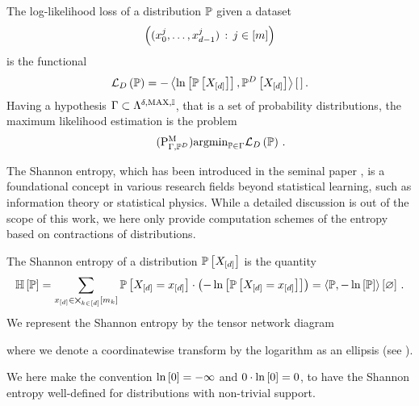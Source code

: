 \begin{definition}
    \label{def:loss}
    The log-likelihood loss of a distribution $\mathbb{P}$ given a dataset
    \begin{align*}
        \left(({x_{0}^{j},\ldots,x_{d-1}^{j}})\,:\,j\in[m]\right)
    \end{align*}
    is the functional
    \begin{align*}
        \mathcal{L}_{D}\left(\mathbb{P}\right)
        = -\left\langle \ln \left[ \mathbb{P}\left[X_{[d]}\right] \right],\mathbb{P}^{D}\left[X_{[d]}\right]\right\rangle \left[ \, \right] .
    \end{align*}
    Having a hypothesis $\Gamma\subset\Lambda^{\delta,\mathrm{MAX},\mathbb{I}}$, that is a set of probability distributions, the maximum likelihood estimation is the problem
    \begin{align}
        \label{prob:parameterMaxLikelihood}\tag{$\probtagtypeinst{\mprojectionsymbol}{\Gamma,\empdistribution}$}
        \argmin_{\probtensorin} \lossof{\probtensor} \, .
    \end{align}
\end{definition}



The Shannon entropy, which has been introduced in the seminal paper \cite{shannon_mathematical_1948}, is a foundational concept in various research fields beyond statistical learning, such as information theory or statistical physics.
While a detailed discussion is out of the scope of this work, we here only provide computation schemes of the entropy based on contractions of distributions.

\begin{definition}
    The Shannon entropy of a distribution $\mathbb{P}\left[X_{[d]}\right]$ is the quantity
    \begin{align*}
        \mathbb{H}\left[\mathbb{P}\right]
        =  \sum_{x_{[d]}\in\bigtimes_{k\in[d]}[m_{k}]} \mathbb{P}\left[X_{[d]}=x_{[d]}\right] \cdot \left(-\ln \left[ \mathbb{P}\left[X_{[d]}=x_{[d]}\right] \right]\right)
        = \left\langle \mathbb{P},-\ln \left[ \mathbb{P} \right]\right\rangle \left[ \varnothing \right] \, .
    \end{align*}
    We represent the Shannon entropy by the tensor network diagram
    \begin{center}
        
    \end{center}
    where we denote a coordinatewise transform by the logarithm as an ellipsis (see ).
\end{definition}

We here make the convention $\ln \left[ 0 \right]=-\infty$ and $0\cdot\ln \left[ 0 \right] = 0$, to have the Shannon entropy well-defined for distributions with non-trivial support.

